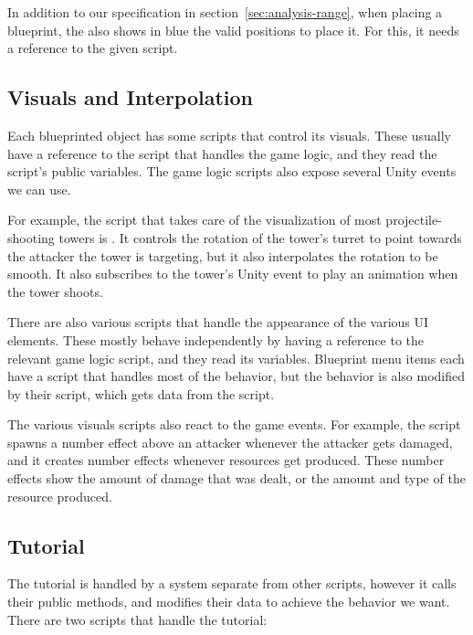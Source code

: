 In addition to our specification in section~\ref{sec:analysis-range}, when placing a blueprint, the  also shows in blue the valid positions to place it.
For this, it needs a reference to the given  script.

\subsection{Visuals and Interpolation}

Each blueprinted object has some scripts that control its visuals.
These usually have a reference to the script that handles the game logic, and they read the script's public variables.
The game logic scripts also expose several Unity events we can use.

For example, the script that takes care of the visualization of most projectile-shooting towers is .
It controls the rotation of the tower's turret to point towards the attacker the tower is targeting, but it also interpolates the rotation to be smooth.
It also subscribes to the tower's  Unity event to play an animation when the tower shoots.

There are also various scripts that handle the appearance of the various UI elements.
These mostly behave independently by having a reference to the relevant game logic script, and they read its variables.
Blueprint menu items each have a  script that handles most of the behavior, but the behavior is also modified by their  script, which gets data from the  script.

The various visuals scripts also react to the game events.
For example, the  script spawns a number effect above an attacker whenever the attacker gets damaged, and it creates number effects whenever resources get produced.
These number effects show the amount of damage that was dealt, or the amount and type of the resource produced.

\subsection{Tutorial}

The tutorial is handled by a system separate from other scripts, however it calls their public methods, and modifies their data to achieve the behavior we want.
There are two scripts that handle the tutorial:

